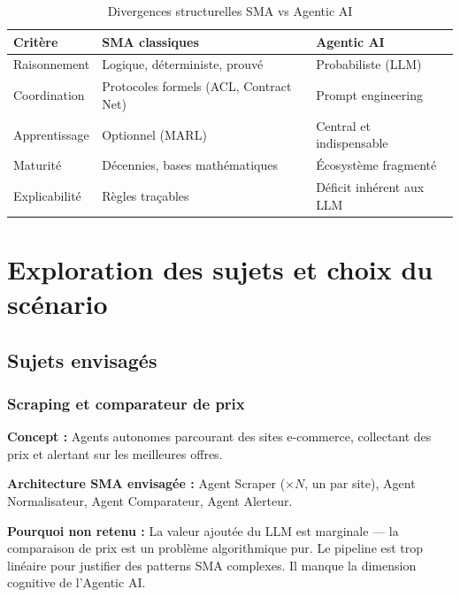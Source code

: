 \documentclass[12pt,a4paper]{report}
\begin{document}
\begin{table}[H]
\centering
\caption{Divergences structurelles SMA vs Agentic AI}
\label{tab:divergences}
\begin{tabularx}{\textwidth}{L{3cm}L{5.5cm}L{4.5cm}}
\toprule
\textbf{Critère} & \textbf{SMA classiques} & \textbf{Agentic AI} \\
\midrule
Raisonnement & Logique, déterministe, prouvé & Probabiliste (LLM) \\
Coordination & Protocoles formels (ACL, Contract Net) & Prompt engineering \\
Apprentissage & Optionnel (MARL) & Central et indispensable \\
Maturité & Décennies, bases mathématiques & Écosystème fragmenté \\
Explicabilité & Règles traçables & Déficit inhérent aux LLM \\
\bottomrule
\end{tabularx}
\end{table}

\chapter{Exploration des sujets et choix du scénario}
\label{chap:sujets}

\section{Sujets envisagés}

\subsection{Scraping et comparateur de prix}

\textbf{Concept :} Agents autonomes parcourant des sites e-commerce, collectant
des prix et alertant sur les meilleures offres.

\textbf{Architecture SMA envisagée :} Agent Scraper ($\times N$, un par site),
Agent Normalisateur, Agent Comparateur, Agent Alerteur.

\textbf{Pourquoi non retenu :} La valeur ajoutée du LLM est marginale --- la
comparaison de prix est un problème algorithmique pur. Le pipeline est trop linéaire
pour justifier des patterns SMA complexes. Il manque la dimension cognitive de
l'Agentic AI.
\end{document}
